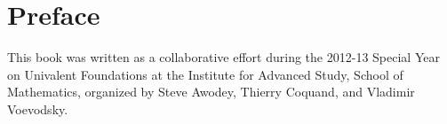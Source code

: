 \chapter*{Preface}
\label{cha:preface}

{%


%

This book was written as a collaborative effort during the 2012-13 Special Year on Univalent Foundations at the Institute for Advanced Study, School of Mathematics, organized by Steve Awodey, Thierry Coquand, and Vladimir Voevodsky.

}
